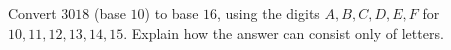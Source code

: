 Convert $3018$ (base $10$) to base $16$, using the digits $A,B,C,D,E,F$ for $10,11,12,13,14,15$. Explain how the answer can consist only of letters.
